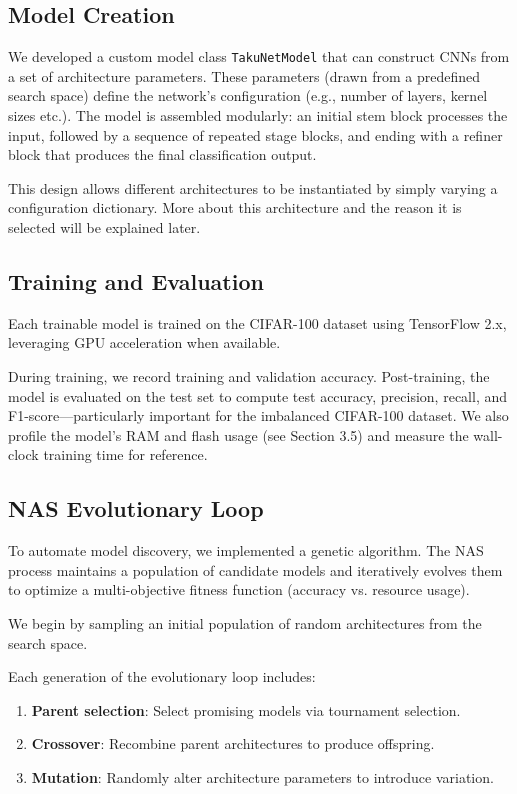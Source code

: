 \subsection*{Model Creation}

We developed a custom model class \texttt{TakuNetModel} that can construct CNNs from a set of architecture parameters. These parameters (drawn from a predefined search space) define the network’s configuration (e.g., number of layers, kernel sizes etc.). The model is assembled modularly: an initial stem block processes the input, followed by a sequence of repeated stage blocks, and ending with a refiner block that produces the final classification output.

This design allows different architectures to be instantiated by simply varying a configuration dictionary. More about this architecture and the reason it is selected will be explained later.

\subsection*{Training and Evaluation}

Each trainable model is trained on the CIFAR-100 dataset using TensorFlow 2.x, leveraging GPU acceleration when available.

During training, we record training and validation accuracy. Post-training, the model is evaluated on the test set to compute test accuracy, precision, recall, and F1-score—particularly important for the imbalanced CIFAR-100 dataset. We also profile the model's RAM and flash usage (see Section 3.5) and measure the wall-clock training time for reference.

\subsection*{NAS Evolutionary Loop}

To automate model discovery, we implemented a genetic algorithm. The NAS process maintains a population of candidate models and iteratively evolves them to optimize a multi-objective fitness function (accuracy vs. resource usage).

We begin by sampling an initial population of random architectures from the search space.

Each generation of the evolutionary loop includes:
\begin{enumerate}
    \item \textbf{Parent selection}: Select promising models via tournament selection.
    \item \textbf{Crossover}: Recombine parent architectures to produce offspring.
    \item \textbf{Mutation}: Randomly alter architecture parameters to introduce variation.
\end{enumerate}


